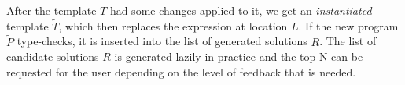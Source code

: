 After the template $T$ had some changes applied to it, we get an
\emph{instantiated} template $\tilde{T}$, which then replaces the expression at
location $L$. If the new program $\tilde{P}$ type-checks, it is inserted into
the list of generated solutions $R$. The list of candidate solutions $R$ is
generated lazily in practice and the top-N can be requested for the user
depending on the level of feedback that is needed.



